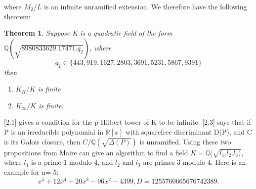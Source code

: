 \documentclass[preprint,12pt,reqno]{elsarticle}
\newtheorem{theorem}{Theorem}
\begin{document}
where $M_2/L$ is an infinite unramified extension. We therefore have the following theorem:
\begin{theorem}
    Suppose K is a quadratic field of the form $\mathbb{Q}(\sqrt{8980833629.17471.q_2})$, where 
    \begin{equation}
        q_2\in\{443,919,1627,2803,3691,5231,5867,9391\}
    \end{equation}
    then \begin{enumerate}
        \item $K_H/K$ is finite
        \item $K_\infty/K$ is finite.
    \end{enumerate}
\end{theorem}
\cite{MAIR}[2.1] gives a condition for the p-Hilbert tower of K to be infinite. 
\newline
\cite{MAIR}[2.3] says that if P is an irreducible polynomial in $\mathbb{R}[x]$ with squarefree discriminant D(P), and C is its Galois closure, then $C/\mathbb{Q}(\sqrt{\Delta(P)})$ is unramified.
\newline
Using these two propositions from Maire can give an algorithm to find a field $K=\mathbb{Q}(\sqrt{l_1.l_2.l_3)}$, where $l_1$ is a prime 1 modulo 4, and $l_2$ and $l_3$ are primes 3 modulo 4. 
\newline
Here is an example for n= 5:
\begin{equation}
    x^5 + 12x^4 + 20x^3 - 96x^2 - 4399, D=1255760665676742389.
\end{equation}
\end{document}

